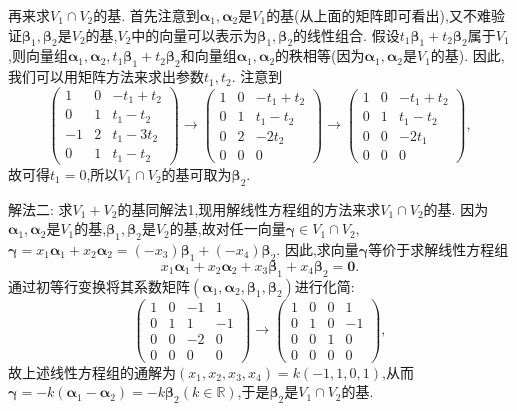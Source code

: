 \documentclass[lang=cn,newtx,10pt,scheme=chinese]{elegantbook}
\begin{document}
\begin{solution}
    再来求\(V_1\cap V_2\)的基. 首先注意到\(\boldsymbol{\alpha}_1,\boldsymbol{\alpha}_2\)是\(V_1\)的基(从上面的矩阵即可看出),又不难验证\(\boldsymbol{\beta}_1,\boldsymbol{\beta}_2\)是\(V_2\)的基,\(V_2\)中的向量可以表示为\(\boldsymbol{\beta}_1,\boldsymbol{\beta}_2\)的线性组合. 假设\(t_1\boldsymbol{\beta}_1 + t_2\boldsymbol{\beta}_2\)属于\(V_1\),则向量组\(\boldsymbol{\alpha}_1,\boldsymbol{\alpha}_2,t_1\boldsymbol{\beta}_1 + t_2\boldsymbol{\beta}_2\)和向量组\(\boldsymbol{\alpha}_1,\boldsymbol{\alpha}_2\)的秩相等(因为\(\boldsymbol{\alpha}_1,\boldsymbol{\alpha}_2\)是\(V_1\)的基). 因此,我们可以用矩阵方法来求出参数\(t_1,t_2\). 注意到
    \[
    \begin{pmatrix}
    1&0&-t_1 + t_2\\
    0&1&t_1 - t_2\\
    -1&2&t_1 - 3t_2\\
    0&1&t_1 - t_2
    \end{pmatrix}\to
    \begin{pmatrix}
    1&0&-t_1 + t_2\\
    0&1&t_1 - t_2\\
    0&2&-2t_2\\
    0&0&0
    \end{pmatrix}\to
    \begin{pmatrix}
    1&0&-t_1 + t_2\\
    0&1&t_1 - t_2\\
    0&0&-2t_1\\
    0&0&0
    \end{pmatrix},
    \]
    故可得\(t_1 = 0\),所以\(V_1\cap V_2\)的基可取为\(\boldsymbol{\beta}_2\).
    
    {\color{blue}解法二:} 求\(V_1 + V_2\)的基同解法1,现用解线性方程组的方法来求\(V_1\cap V_2\)的基. 因为\(\boldsymbol{\alpha}_1,\boldsymbol{\alpha}_2\)是\(V_1\)的基,\(\boldsymbol{\beta}_1,\boldsymbol{\beta}_2\)是\(V_2\)的基,故对任一向量\(\boldsymbol{\gamma}\in V_1\cap V_2\),\(\boldsymbol{\gamma}=x_1\boldsymbol{\alpha}_1 + x_2\boldsymbol{\alpha}_2=(-x_3)\boldsymbol{\beta}_1 + (-x_4)\boldsymbol{\beta}_2\). 因此,求向量\(\boldsymbol{\gamma}\)等价于求解线性方程组
    \[
    x_1\boldsymbol{\alpha}_1 + x_2\boldsymbol{\alpha}_2 + x_3\boldsymbol{\beta}_1 + x_4\boldsymbol{\beta}_2=\boldsymbol{0}.
    \]
    通过初等行变换将其系数矩阵\((\boldsymbol{\alpha}_1,\boldsymbol{\alpha}_2,\boldsymbol{\beta}_1,\boldsymbol{\beta}_2)\)进行化简:
    \[
    \begin{pmatrix}
    1&0&-1&1\\
    0&1&1&-1\\
    0&0&-2&0\\
    0&0&0&0
    \end{pmatrix}\to
    \begin{pmatrix}
    1&0&0&1\\
    0&1&0&-1\\
    0&0&1&0\\
    0&0&0&0
    \end{pmatrix},
    \]
    故上述线性方程组的通解为\((x_1,x_2,x_3,x_4)=k(-1,1,0,1)\),从而\(\boldsymbol{\gamma}=-k(\boldsymbol{\alpha}_1 - \boldsymbol{\alpha}_2)=-k\boldsymbol{\beta}_2(k\in\mathbb{R})\),于是\(\boldsymbol{\beta}_2\)是\(V_1\cap V_2\)的基. 
\end{solution}
\end{document}
